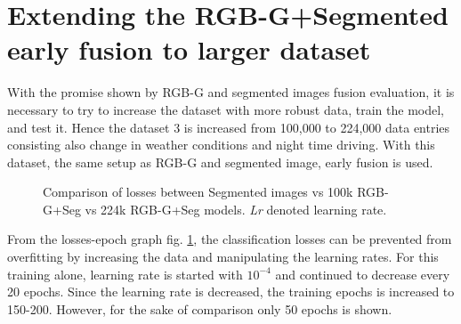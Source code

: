 \section{Extending the RGB-G+Segmented early fusion to larger dataset}
With the promise shown by RGB-G and segmented images fusion evaluation, it is necessary to
try to increase the dataset with more robust data, train the model, and test it. Hence the
dataset 3 is increased from 100,000 to 224,000 data entries consisting also change in
weather conditions and night time driving. With this dataset, the same setup as RGB-G and
segmented image, early fusion is used.
\begin{figure}[!ht]
    \centering
    \def\svgwidth{\textwidth}
    
    \caption{Comparison of losses between Segmented images vs 100k RGB-G+Seg vs 224k
    RGB-G+Seg models. \textit{Lr} denoted learning rate.}
    \label{fig:224kdatafusionlosses2}
\end{figure}
From the losses-epoch graph fig. \ref{fig:224kdatafusionlosses2}, the classification
losses can be prevented from overfitting by increasing the data and manipulating the
learning rates. For this training alone, learning rate is started with $10^{-4}$ and
continued to decrease every 20 epochs. Since the learning rate is decreased, the training
epochs is increased to 150-200. However, for the sake of comparison only 50 epochs is
shown.

